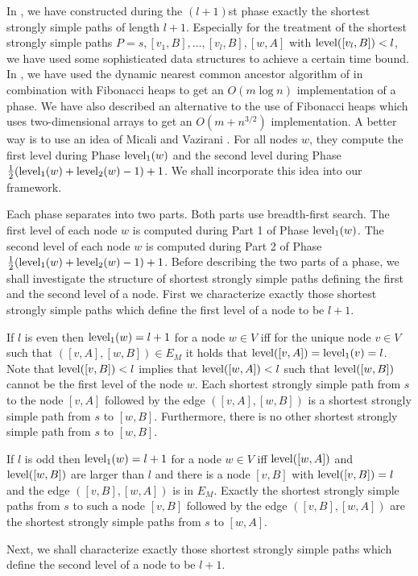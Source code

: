 \documentclass[12pt,twoside,a4paper]{article}
\def\lev{{\rm level}}
\begin{document}
In \cite{Bl1,Bl4}, we have constructed during the
$(l+1)$st phase exactly the shortest strongly simple paths of length $l+1$. Especially for
the treatment of the shortest strongly simple paths $P = s,[v_1,B], \ldots,[v_l,B],[w,A]$
with $\lev([v_l,B]) < l$, we have used some sophisticated data structures to achieve a 
certain time bound. In \cite{Bl4}, we have used the dynamic nearest common ancestor algorithm 
of \cite{Ga2} in combination with Fibonacci heaps \cite{FrTa} to get an
$O(m \log n)$ implementation of a phase. We have also described an alternative to the
use of Fibonacci heaps which uses two-dimensional arrays to get an $O(m + n^{3/2})$
implementation. A better way is to use an idea of Micali and Vazirani \cite{MV,Va1}. 
For all nodes $w$, they compute the first level during Phase $\lev_1(w)$ and the second level 
during Phase $\frac{1}{2}(\lev_1(w) + \lev_2(w) - 1) + 1$. We shall incorporate this idea into 
our framework.

Each phase separates into two parts. Both parts use breadth-first search.
The first level of each node $w$ is computed during Part 1 of Phase $\lev_1(w)$.
The second level of each node $w$ is computed during Part 2 of Phase
$\frac{1}{2}(\lev_1(w) + \lev_2(w) - 1)+1$. Before describing the two parts of a phase,
we shall investigate the structure of shortest strongly simple paths defining the first 
and the second level of a node.
First we characterize exactly those shortest strongly simple paths which define
the first level of a node to be $l+1$. 

\medskip
If $l$ is even then $\lev_1(w) = l+1$ for a node $w \in V$ iff for the unique node 
$v \in V$ such that $([v,A],[w,B]) \in E_M$ it holds that $\lev([v,A]) = \lev_1(v) = l$. 
Note that $\lev([v,B]) < l$ implies that $\lev([w,A]) < l$ such that $\lev([w,B])$ cannot 
be the first level of the node $w$. Each shortest strongly simple path from $s$ to the
node $[v,A]$ followed by the edge $([v,A],[w,B])$ is a shortest strongly simple path
from $s$ to $[w,B]$. Furthermore, there is no other shortest strongly simple path from
$s$ to $[w,B]$.

If $l$ is odd then $\lev_1(w) = l+1$ for a node $w \in V$ iff $\lev([w,A])$ and 
$\lev([w,B])$ are larger than $l$ and there is a node $[v,B]$ with $\lev([v,B]) = l$
and the edge $([v,B],[w,A])$ is in $E_M$. Exactly the shortest strongly simple paths
from $s$ to such a node $[v,B]$ followed by the edge $([v,B],[w,A])$ are
the shortest strongly simple paths from $s$ to $[w,A]$.

\medskip
Next, we shall characterize exactly those shortest strongly simple paths which define
the second level of a node to be $l+1$. 
\end{document}
